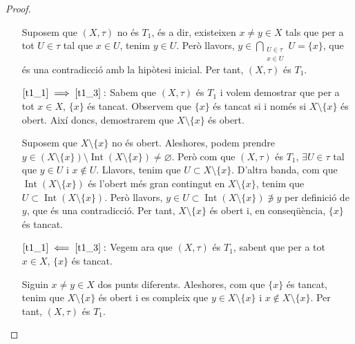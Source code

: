\documentclass[10pt,a4paper]{article}
\theoremstyle{definition}
\DeclareMathOperator{\Int}{Int} %
\begin{document}
\begin{proof}
\begin{itemize}[leftmargin=2cm]
                  Suposem que $(X,\tau)$ no és $T_1$, és a dir, existeixen $x\ne y\in X$ tals que per a tot $U\in\tau$ tal que $x\in U$, tenim $y\in U$. Però llavors, $y\in\bigcap_{\substack{U\in \tau\\x\in U}}U=\{x\}$, que és una contradicció amb la hipòtesi inicial. Per tant, $(X,\tau)$ és $T_1$.
            \item [$\ref{t1_1}\implies\ref{t1_3}:$] Sabem que $(X,\tau)$ és $T_1$ i volem demostrar que per a tot $x\in X$, $\{x\}$ és tancat. Observem que $\{x\}$ és tancat si i només si $X\setminus\{x\}$ és obert. Així doncs, demostrarem que $X\setminus\{x\}$ és obert.

                  Suposem que $X\setminus\{x\}$ no és obert. Aleshores, podem prendre $y\in (X\setminus\{x\})\setminus\Int(X\setminus\{x\})\ne\varnothing$. Però com que $(X,\tau)$ és $T_1$, $\exists U\in\tau$ tal que $y\in U$ i $x\notin U$. Llavors, tenim que $U\subset X\setminus\{x\}$. D'altra banda, com que $\Int(X\setminus\{x\})$ és l'obert més gran contingut en $X\setminus\{x\}$, tenim que $U\subset\Int(X\setminus\{x\})$. Però llavors, $y\in U\subset\Int(X\setminus\{x\})\not\ni y$ per definició de $y$, que és una contradicció. Per tant, $X\setminus\{x\}$ és obert i, en conseqüència, $\{x\}$ és tancat.
            \item [$\ref{t1_1}\impliedby\ref{t1_3}:$] Vegem ara que $(X,\tau)$ és $T_1$, sabent que per a tot $x\in X$, $\{x\}$ és tancat.

                  Siguin $x\ne y\in X$ dos punts diferents. Aleshores, com que $\{x\}$ és tancat, tenim que $X\setminus\{x\}$ és obert i es compleix que $y\in X\setminus\{x\}$ i $x\notin X\setminus\{x\}$. Per tant, $(X,\tau)$ és $T_1$.
      \end{itemize}
\end{proof}
\end{document}
